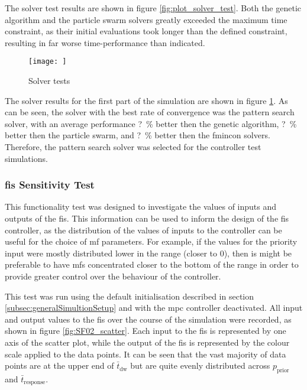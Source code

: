 \documentclass[conference]{IEEEtran}
\begin{document}
The solver test results are shown in figure \ref{fig:plot_solver_test}.
Both the genetic algorithm and the particle swarm solvers greatly exceeded the maximum time constraint, as their initial evaluations took longer than the defined constraint, resulting in far worse time-performance than indicated.

\begin{figure}
    \centering
    \texttt{[image: ]}
    \caption{Solver tests}
    \label{fig:plot_solver_test_init}
\end{figure}
 
The solver results for the first part of the simulation are shown in figure \ref{fig:plot_solver_test_init}.
As can be seen, the solver with the best rate of convergence was the pattern search solver, with an average performance \SI{?}{\percent} better then the genetic algorithm, \SI{?}{\percent} better then the particle swarm, and \SI{?}{\percent} better then the fmincon solvers.
Therefore, the pattern search solver was selected for the controller test simulations.

\subsubsection{\gls{fis} Sensitivity Test}


This functionality test was designed to investigate the values of inputs and outputs of the \gls{fis}.
This information can be used to inform the design of the \gls{fis} controller, as the distribution of the values of inputs to the controller can be useful for the choice of \gls{mf} parameters.
For example, if the values for the priority input were mostly distributed lower in the range (closer to 0), then is might be preferable to have \gls{mf}s concentrated closer to the bottom of the range in order to provide greater control over the behaviour of the controller.

This test was run using the default initialisation described in section \ref{subsec:generalSimultionSetup} and with the \gls{mpc} controller deactivated.
All input and output values to the \gls{fis} over the course of the simulation were recorded, as shown in figure \ref{fig:SF02_scatter}.
Each input to the \gls{fis} is represented by one axis of the scatter plot, while the output of the \gls{fis} is represented by the colour scale applied to the data points.
It can be seen that the vast majority of data points are at the upper end of $\bar{t}_{\text{dw}}$ but are quite evenly distributed across $p_{\text{prior}}$ and $\bar{t}_{\text{response}}$.
\end{document}
